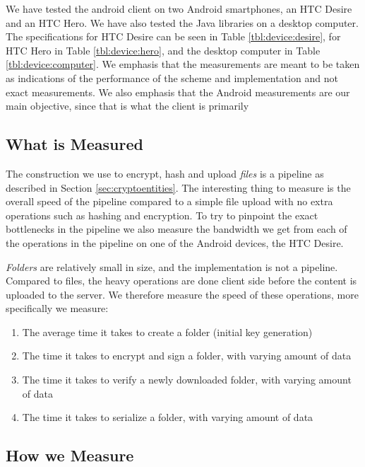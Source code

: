 \documentclass[pdftex,english,10pt,b5paper,twoside]{book}
\begin{document}
We have tested the android client on two Android smartphones, an HTC Desire and
an HTC Hero. We have also tested the Java libraries on a desktop computer. The
specifications for HTC Desire can be seen in Table \ref{tbl:device:desire}, for
HTC Hero in Table \ref{tbl:device:hero}, and the desktop computer in Table
\ref{tbl:device:computer}. We emphasis that the measurements are meant to be
taken as indications of the performance of the scheme and implementation and
not exact measurements. We also emphasis that the Android measurements are our
main objective, since that is what the client is primarily





\subsection{What is Measured}

The construction we use to encrypt, hash and upload \emph{files} is a pipeline
as described in Section \ref{sec:cryptoentities}. The interesting thing to
measure is the overall speed of the pipeline compared to a simple file upload
with no extra operations such as hashing and encryption. To try to pinpoint the
exact bottlenecks in the pipeline we also measure the bandwidth we get from
each of the operations in the pipeline on one of the Android devices, the HTC
Desire.

\emph{Folders} are relatively small in size, and the implementation is not a
pipeline. Compared to files, the heavy operations are done client side before
the content is uploaded to the server. We therefore measure the speed of these
operations, more specifically we measure:

\begin{enumerate}
    \item The average time it takes to create a folder (initial key generation)
    \item The time it takes to encrypt and sign a folder, with varying amount
        of data
    \item The time it takes to verify a newly downloaded folder, with varying
        amount of data
    \item The time it takes to serialize a folder, with varying amount of data
\end{enumerate}

\subsection{How we Measure}
\end{document}
